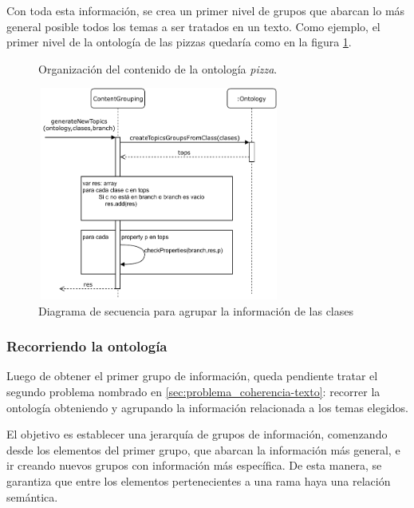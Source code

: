 Con toda esta información, se crea un primer nivel de grupos que abarcan lo más general posible todos los temas a ser tratados en un texto. Como ejemplo, el primer nivel de la ontología de las pizzas quedaría como en la figura \ref{fig:macro_planning_pizza}.
\begin{figure}[H]
\caption{Organización del contenido de la ontología \emph{pizza}.}
\label{fig:macro_planning_pizza}
\end{figure}

\begin{figure}[H]
    \centering
    \includegraphics[width=8cm, height=7cm]{img/organizacion_informacion/secuencia_contentGrouping.pdf}
    \caption{Diagrama de secuencia para agrupar la información de las clases}
    \label{fig:diagrama_secuencia_contentGrouping}
\end{figure}


\subsubsection{Recorriendo la ontología}
Luego de obtener el primer grupo de información, queda pendiente tratar el segundo problema nombrado en \ref{sec:problema_coherencia-texto}: recorrer la ontología obteniendo y agrupando la información relacionada a los temas elegidos. 

El objetivo es establecer una jerarquía de grupos de información, comenzando desde los elementos del primer grupo, que abarcan la información más general, e ir creando nuevos grupos con información más específica. De esta manera, se garantiza que entre los elementos pertenecientes a una rama haya una relación semántica.

